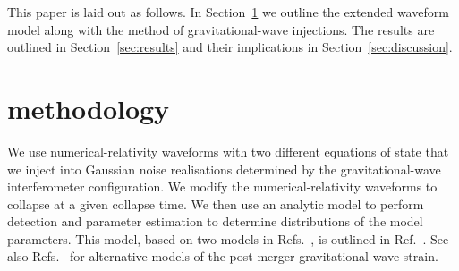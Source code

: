 \documentclass[
reprint,
prd,
twocolumn,
nofootinbib,
 amsmath,
showpacs ,amssymb, aps,%
superscriptaddress
]{revtex4-1}
\begin{document}
    This paper is laid out as follows. In Section~\ref{sec:methodology} we outline the extended waveform model along with the method of gravitational-wave injections.
    The results are outlined in Section~\ref{sec:results} and their implications in Section~\ref{sec:discussion}.
    \vspace{-0.25cm}
    \section{methodology}\label{sec:methodology}
    We use numerical-relativity waveforms with two different equations of state that we inject into Gaussian noise realisations determined by the gravitational-wave interferometer configuration.
    We modify the numerical-relativity waveforms to collapse at a given collapse time.
    We then use an analytic model to perform detection and parameter estimation to determine distributions of the model parameters.
    This model, based on two models in Refs.~\cite{Bauswein2016,Bose2018}, is outlined in Ref.~\cite{Easter2020}.
    See also Refs.~\cite{Tsang2019,Breschi2019} for alternative models of the post-merger gravitational-wave strain.
 
\end{document}
